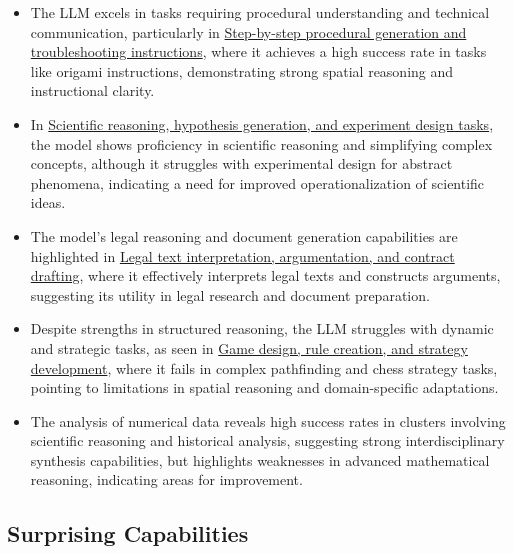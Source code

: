 \documentclass[fleqn,10pt]{wlscirep}
\providecommand{\tightlist}{%
  \setlength{\itemsep}{0pt}\setlength{\parskip}{0pt}}
\begin{document}
\begin{itemize}
\tightlist
\item
  The LLM excels in tasks requiring procedural understanding and
  technical communication, particularly in
  \protect\hyperlink{step-by-step-procedural-generation-and-troubleshooting-instructions}{Step-by-step
  procedural generation and troubleshooting instructions}, where it
  achieves a high success rate in tasks like origami instructions,
  demonstrating strong spatial reasoning and instructional clarity.
\item
  In
  \protect\hyperlink{scientific-reasoning-hypothesis-generation-and-experiment-design-tasks}{Scientific
  reasoning, hypothesis generation, and experiment design tasks}, the
  model shows proficiency in scientific reasoning and simplifying
  complex concepts, although it struggles with experimental design for
  abstract phenomena, indicating a need for improved operationalization
  of scientific ideas.
\item
  The model's legal reasoning and document generation capabilities are
  highlighted in
  \protect\hyperlink{legal-text-interpretation-argumentation-and-contract-drafting}{Legal
  text interpretation, argumentation, and contract drafting}, where it
  effectively interprets legal texts and constructs arguments,
  suggesting its utility in legal research and document preparation.
\item
  Despite strengths in structured reasoning, the LLM struggles with
  dynamic and strategic tasks, as seen in
  \protect\hyperlink{game-design-rule-creation-and-strategy-development}{Game
  design, rule creation, and strategy development}, where it fails in
  complex pathfinding and chess strategy tasks, pointing to limitations
  in spatial reasoning and domain-specific adaptations.
\item
  The analysis of numerical data reveals high success rates in clusters
  involving scientific reasoning and historical analysis, suggesting
  strong interdisciplinary synthesis capabilities, but highlights
  weaknesses in advanced mathematical reasoning, indicating areas for
  improvement.
\end{itemize}

\hypertarget{surprising-capabilities}{%
\subsection{Surprising Capabilities}\label{surprising-capabilities}}
\end{document}
